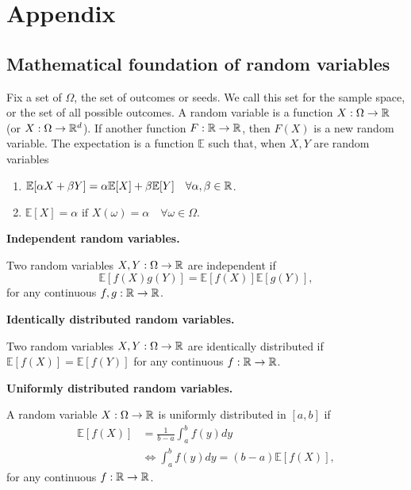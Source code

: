 \section{Appendix}\label{sec:Appendix A}

\subsection{Mathematical foundation of random variables}\label{app:stochastic_maths}
Fix a set of $\Omega$, the set of outcomes or seeds. We call this set for the sample space, or the set of all possible outcomes. A random variable is a function $X:\Omega \to\mathbb{R}$ (or $X:\Omega\to\mathbb{R}^d$). If another function $F: \mathbb{R}\to\mathbb{R}$, then $F(X)$ is a new random variable. The expectation is a function $\mathbb{E}$ such that, when $X, Y$ are random variables
\begin{enumerate}
    \item $\mathbb{E}[\alpha X + \beta Y] = \alpha\mathbb{E}[X]+\beta\mathbb{E}[Y] \quad \forall \alpha, \beta \in\mathbb{R}$.
    \item $\mathbb{E}[X]=\alpha \text{ if } X(\omega) = \alpha\quad \forall\omega\in\Omega. $
\end{enumerate}

\textbf{Independent random variables.}

Two random variables $X, Y: \Omega\to\mathbb{R}$ are independent if 
\begin{equation*}
    \mathbb{E}[f(X)g(Y)] = \mathbb{E}[f(X)]\mathbb{E}[g(Y)], 
\end{equation*}
for any continuous $f, g: \mathbb{R}\to\mathbb{R}$. 

\textbf{Identically distributed random variables.}

Two random variables $X,Y:\Omega\to\mathbb{R}$ are identically distributed if $\mathbb{E}[f(X)] = \mathbb{E}[f(Y)]$ for any continuous $f:\mathbb{R}\to\mathbb{R}$. 

\textbf{Uniformly distributed random variables.}

A random variable $X:\Omega\to\mathbb{R}$ is uniformly distributed in $[a,b]$ if 
\begin{equation*}
    \begin{split}
        \mathbb{E}[f(X)] &= \frac{1}{b-a}\int_a^bf(y)dy \\ 
        &\Leftrightarrow \int_a^b f(y)dy = (b-a)\mathbb{E}[f(X)], 
    \end{split}
\end{equation*}
for any continuous $f:\mathbb{R}\to\mathbb{R}$.

